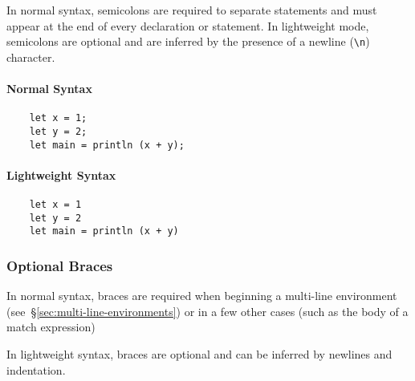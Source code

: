 \documentclass{report}
\begin{document}
In normal syntax, semicolons are required to separate statements and must appear at the end of every declaration or statement. In lightweight mode, semicolons are optional and are inferred by the presence of a newline (\verb|\n|) character.

\begin{paracol}{2}
    \paragraph{Normal Syntax}
    \begin{verbatim}
    let x = 1;
    let y = 2;
    let main = println (x + y);
    \end{verbatim}

    \switchcolumn{}
    \paragraph{Lightweight Syntax}
    \begin{verbatim}
    let x = 1
    let y = 2
    let main = println (x + y)
    \end{verbatim}
\end{paracol}


\subsubsection*{Optional Braces}

In normal syntax, braces are required when beginning a multi-line environment (see~§\ref{sec:multi-line-environments})
or in a few other cases (such as the body of a match expression)

In lightweight syntax, braces are optional and can be inferred by newlines and indentation.
\end{document}
